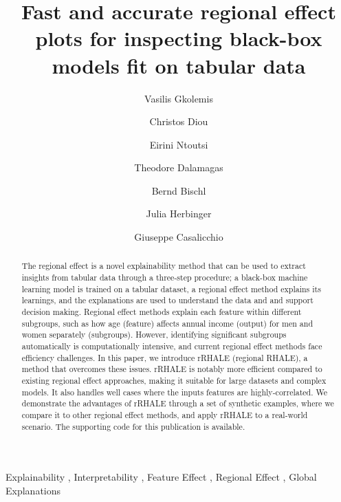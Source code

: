 \documentclass[
twocolumn,
]{ceurart}
\begin{document}


\title{Fast and accurate regional effect plots for inspecting black-box models fit on tabular data}

\author[1,2]{Vasilis Gkolemis}
\address[1]{Harokopio University of Athens}
\address[2]{ATHENA Research Center}
\author[1]{Christos Diou}
\author[3]{Eirini Ntoutsi}
\address[3]{University of the Bundeswehr Munich}
\author[2]{Theodore Dalamagas}
\author[4]{Bernd Bischl}
\address[4]{Munich Center for Machine Learning (MCML), Department of Statistics, LMU Munich}
\author[4]{Julia Herbinger}
\author[4]{Giuseppe Casalicchio}


\begin{abstract}
  The regional effect is a novel explainability method that can be used to extract insights from tabular data through a three-step procedure; a black-box machine learning model is trained on a tabular dataset, a regional effect method explains its learnings, and the explanations are used to understand the data and and support decision making.
  Regional effect methods explain each feature within different subgroups, such as how age (feature) affects annual income (output) for men and women separately (subgroups). However, identifying significant subgroups automatically is computationally intensive, and current regional effect methods face efficiency challenges.
  In this paper, we introduce rRHALE (regional RHALE), a method that overcomes these issues. rRHALE is notably more efficient compared to existing regional effect approaches, making it suitable for large datasets and complex models. It also handles well cases where the inputs features are highly-correlated. We demonstrate the advantages of rRHALE through a set of synthetic examples, where we compare it to other regional effect methods, and apply  rRHALE to a real-world scenario. The supporting code for this publication is available.
\end{abstract}

\begin{keywords}
  Explainability \sep
  Interpretability \sep
  Feature Effect \sep
  Regional Effect \sep
  Global Explanations
\end{keywords}
\end{document}
